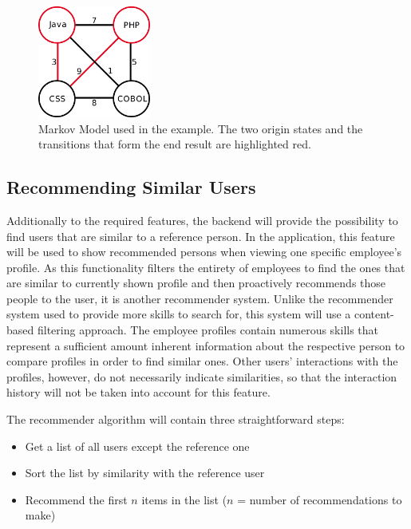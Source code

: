 \begin{figure}[!htp]
    \centering
    \includegraphics[width=0.33\textwidth]{images/markov_impl.png}
    \caption[Diagram: Search Suggestion Markov Model]{Markov Model used in the example. The two origin states and the transitions that form the end result are highlighted red.}
    \label{fig:wireframe}
\end{figure}

\newpage

\subsection{Recommending Similar Users}
\label{similar}
Additionally to the required features, the backend will provide the possibility to find users that are similar to a reference person.
In the application, this feature will be used to show recommended persons when viewing one specific employee's profile. As this functionality filters the entirety of employees to find the ones that are similar to currently shown profile and then proactively recommends those people to the user, it is another recommender system.
Unlike the recommender system used to provide more skills to search for, this system will use a content-based filtering approach. The employee profiles contain numerous skills that represent a sufficient amount inherent information about the respective person to compare profiles in order to find similar ones. Other users' interactions with the profiles, however, do not necessarily indicate similarities, so that the interaction history will not be taken into account for this feature.

The recommender algorithm will contain three straightforward steps:
\begin{itemize}
	\item Get a list of all users except the reference one
	\item Sort the list by similarity with the reference user
	\item Recommend the first $n$ items in the list ($n$ = number of recommendations to make)
\end{itemize}

